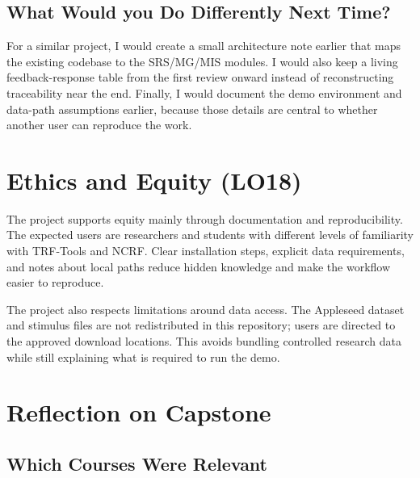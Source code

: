 \documentclass{article}
\begin{document}
\subsection{What Would you Do Differently Next Time?}


For a similar project, I would create a small architecture note earlier that maps the existing codebase to the SRS/MG/MIS modules. I would also keep a living feedback-response table from the first review onward instead of reconstructing traceability near the end. Finally, I would document the demo environment and data-path assumptions earlier, because those details are central to whether another user can reproduce the work.

\section{Ethics and Equity (LO18)}


The project supports equity mainly through documentation and reproducibility. The expected users are researchers and students with different levels of familiarity with TRF-Tools and NCRF. Clear installation steps, explicit data requirements, and notes about local paths reduce hidden knowledge and make the workflow easier to reproduce.

The project also respects limitations around data access. The Appleseed dataset and stimulus files are not redistributed in this repository; users are directed to the approved download locations. This avoids bundling controlled research data while still explaining what is required to run the demo.

\section{Reflection on Capstone}


\subsection{Which Courses Were Relevant}
\end{document}

